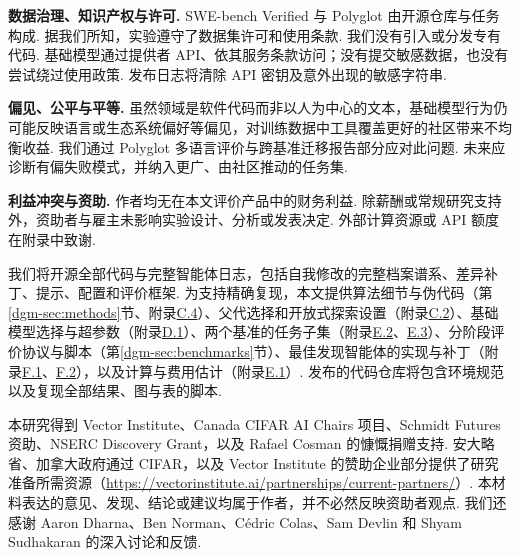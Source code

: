\textbf{数据治理、知识产权与许可.} SWE-bench Verified 与 Polyglot 由开源仓库与任务构成. 据我们所知，实验遵守了数据集许可和使用条款. 我们没有引入或分发专有代码. 基础模型通过提供者 API、依其服务条款访问；没有提交敏感数据，也没有尝试绕过使用政策. 发布日志将清除 API 密钥及意外出现的敏感字符串.

\textbf{偏见、公平与平等.} 虽然领域是软件代码而非以人为中心的文本，基础模型行为仍可能反映语言或生态系统偏好等偏见，对训练数据中工具覆盖更好的社区带来不均衡收益. 我们通过 Polyglot 多语言评价与跨基准迁移报告部分应对此问题. 未来应诊断有偏失败模式，并纳入更广、由社区推动的任务集.

\textbf{利益冲突与资助.} 作者均无在本文评价产品中的财务利益. 除薪酬或常规研究支持外，资助者与雇主未影响实验设计、分析或发表决定. 外部计算资源或 API 额度在附录中致谢.

\label{dgm-reproducibility}
我们将开源全部代码与完整智能体日志，包括自我修改的完整档案谱系、差异补丁、提示、配置和评价框架. 为支持精确复现，本文提供算法细节与伪代码（第\ref{dgm-sec:methods}节、附录\hyperref[dgm-app:pseudocode]{C.4}）、父代选择和开放式探索设置（附录\hyperref[dgm-app:parent-select]{C.2}）、基础模型选择与超参数（附录\hyperref[dgm-app:fm-hyperparam]{D.1}）、两个基准的任务子集（附录\hyperref[dgm-app:swebench-tasks]{E.2}、\hyperref[dgm-app:polyglot-tasks]{E.3}）、分阶段评价协议与脚本（第\ref{dgm-sec:benchmarks}节）、最佳发现智能体的实现与补丁（附录\hyperref[dgm-app:best-agent-dgm]{F.1}、\hyperref[dgm-app:best-agent-dgm-polyglot]{F.2}），以及计算与费用估计（附录\hyperref[dgm-app:cost-estimate]{E.1}）. 发布的代码仓库将包含环境规范以及复现全部结果、图与表的脚本.

\label{dgm-acknowledgments}
本研究得到 Vector Institute、Canada CIFAR AI Chairs 项目、Schmidt Futures 资助、NSERC Discovery Grant，以及 Rafael Cosman 的慷慨捐赠支持. 安大略省、加拿大政府通过 CIFAR，以及 Vector Institute 的赞助企业部分提供了研究准备所需资源（\url{https://vectorinstitute.ai/partnerships/current-partners/}）. 本材料表达的意见、发现、结论或建议均属于作者，并不必然反映资助者观点. 我们还感谢 Aaron Dharna、Ben Norman、Cédric Colas、Sam Devlin 和 Shyam Sudhakaran 的深入讨论和反馈.
